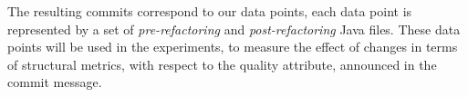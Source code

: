 \begin{comment}

\begin{itemize}
    \item commit id for those commits that contain either “\%duplicat\%” or “\%code clone\%” in the commit message
    \item Refactoring type is `extract method'
    \item code entity is method
\end{itemize}



\begin{figure*}[htbp]
	\centering
    \texttt{[image: Images/CommitMessage.png]}   
    \caption{Commit message indicating the removal of code duplication \citep{commons-bcel}.}
    \label{fig:commit message}

\vspace{0.70cm}

	\centering
    \texttt{[image: Images/DuplicateMethod1.png]}   
    \caption{Code snippet depicting the first instance of code duplication before refactoring \citep{commons-bcel}.}
    \label{fig:duplicate 1}

\vspace{0.70cm}

\centering 
\texttt{[image: Images/DuplicateMethod2.png]}
\caption{Code snippet depicting the second instance of code duplication before refactoring \citep{commons-bcel}.}
\label{fig:duplicate 2}

\vspace{0.70cm}

\centering 
\texttt{[image: Images/ExtractedMethod.png]}
\caption{Code snippet depicting the removal of the duplicated code through the `Extract Method' refactoring \citep{commons-bcel}.}
\label{fig:}
\label{fig:method extraction}
\vspace{0.70cm}


\end{figure*}
\end{comment}

The resulting commits correspond to our data points, each data point is represented by a set of \textit{pre-refactoring} and \textit{post-refactoring} Java files. These data points will be used in the experiments, to measure the effect of changes in terms of structural metrics, with respect to the quality attribute, announced in the commit message.

